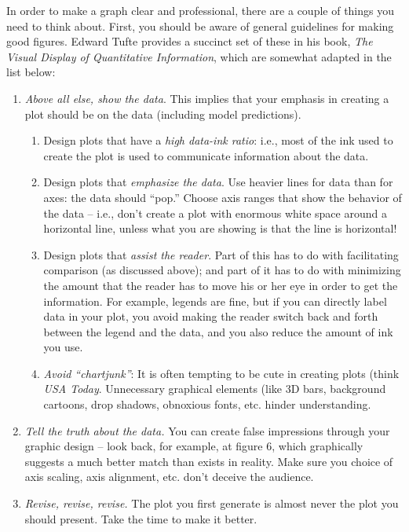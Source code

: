 In order to make a graph clear and professional, there are a couple of things you need to think about.  First, you should be aware of general guidelines for making good figures.  Edward Tufte provides a succinct set of these in his book, {\it The Visual Display of Quantitative Information}, which are somewhat adapted in the list below:
\begin{enumerate}
\item {\em Above all else, show the data}.  This implies that your emphasis in creating a plot should be on the data (including model predictions).  
\begin{enumerate}
\item Design plots that have a {\em high data-ink ratio}:  i.e., most of the ink used to create the plot is used to communicate information about the data.  
\item Design plots that {\em emphasize the data}.  Use heavier lines for data than for axes: the data should ``pop.''  Choose axis ranges that show the behavior of the data -- i.e., don't create a plot with enormous white space around a horizontal line, unless what you are showing is that the line is horizontal!  
\item Design plots that {\em assist the reader}.  Part of this has to do with facilitating comparison (as discussed above); and part of it has to do with minimizing the amount that the reader has to move his or her eye in order to get the information.  For example, legends are fine, but if you can directly label data in your plot, you avoid making the reader switch back and forth between the legend and the data, and you also reduce the amount of ink you use.
\item {\em Avoid ``chartjunk''}: It is often tempting to be cute in creating plots (think {\it USA Today}.  Unnecessary graphical elements (like 3D bars, background cartoons, drop shadows, obnoxious fonts, etc. hinder understanding. 
\end{enumerate}
\item {\em Tell the truth about the data.} You can create false impressions through your graphic design -- look back, for example, at figure 6, which graphically suggests a much better match than exists in reality.  Make sure you choice of axis scaling, axis alignment, etc. don't deceive the audience.
\item {\em Revise, revise, revise.}  The plot you first generate is almost never the plot you should present.  Take the time to make it better.
\end{enumerate}

